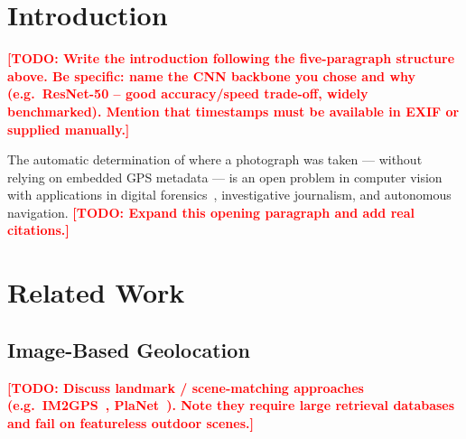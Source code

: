\documentclass[conference]{IEEEtran}
\newcommand{\todo}[1]{\textcolor{red}{\textbf{[TODO: #1]}}}
\begin{document}
\section{Introduction}

\todo{Write the introduction following the five-paragraph structure above.
Be specific: name the CNN backbone you chose and why (e.g.\ ResNet-50 –
good accuracy/speed trade-off, widely benchmarked). Mention that
timestamps must be available in EXIF or supplied manually.}

The automatic determination of where a photograph was taken — without
relying on embedded GPS metadata — is an open problem in computer vision
with applications in digital forensics~\cite{placeholder_forensics},
investigative journalism, and autonomous navigation.
\todo{Expand this opening paragraph and add real citations.}


%
%
\section{Related Work}

\subsection{Image-Based Geolocation}
\todo{Discuss landmark / scene-matching approaches (e.g.\ IM2GPS~\cite{placeholder_im2gps},
PlaNet~\cite{placeholder_planet}). Note they require large retrieval databases
and fail on featureless outdoor scenes.}
\end{document}
